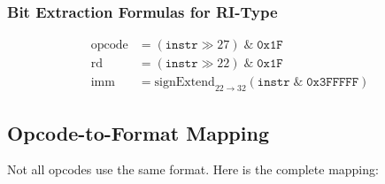 \documentclass[12pt,a4paper]{article}
\begin{document}
\subsubsection{Bit Extraction Formulas for RI-Type}

\begin{align}
\text{opcode} &= (\texttt{instr} \gg 27) \;\&\; \texttt{0x1F} \\
\text{rd} &= (\texttt{instr} \gg 22) \;\&\; \texttt{0x1F} \\
\text{imm} &= \text{signExtend}_{22 \to 32}(\texttt{instr} \;\&\; \texttt{0x3FFFFF})
\end{align}

\subsection{Opcode-to-Format Mapping}

Not all opcodes use the same format. Here is the complete mapping:
\end{document}
